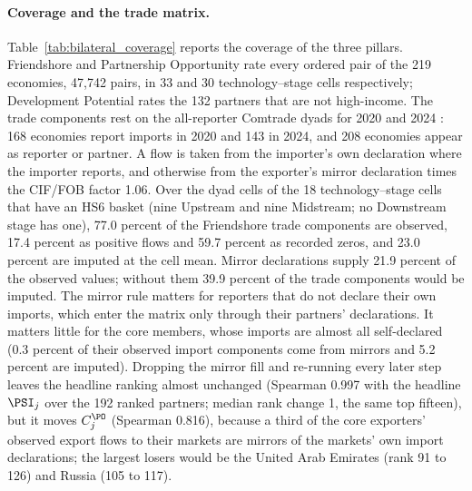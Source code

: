 \paragraph{Coverage and the trade matrix.} Table~\ref{tab:bilateral_coverage} reports the coverage
of the three pillars. Friendshore and Partnership Opportunity rate every ordered pair of the 219
economies, 47,742 pairs, in 33 and 30 technology--stage cells respectively; Development Potential
rates the 132 partners that are not high-income. The trade components rest on the all-reporter
Comtrade dyads for 2020 and 2024 \citep{uncomtrade}: 168 economies report imports in 2020 and 143 in
2024, and 208 economies appear as reporter or partner. A flow is taken from the importer's own
declaration where the importer reports, and otherwise from the exporter's mirror declaration times
the CIF/FOB factor 1.06. Over the dyad cells of the 18 technology--stage cells that have an HS6
basket (nine Upstream and nine Midstream; no Downstream stage has one), 77.0 percent of the
Friendshore trade components are observed, 17.4 percent as positive flows and 59.7 percent as
recorded zeros, and 23.0 percent are imputed at the cell mean. Mirror declarations supply 21.9
percent of the observed values; without them 39.9 percent of the trade components would be imputed.
The mirror rule matters for reporters that do not declare their own imports, which enter the matrix
only through their partners' declarations. It matters little for the core members, whose imports
are almost all self-declared (0.3 percent of their observed import components come from mirrors and
5.2 percent are imputed). Dropping the mirror fill and re-running every later step leaves the
headline ranking almost unchanged (Spearman 0.997 with the headline $\PSI_j$ over the 192 ranked
partners; median rank change 1, the same top fifteen), but it moves $C^{\PO}_j$ (Spearman 0.816),
because a third of the core exporters' observed export flows to their markets are mirrors of the
markets' own import declarations; the largest losers would be the United Arab Emirates (rank 91 to
126) and Russia (105 to 117).

